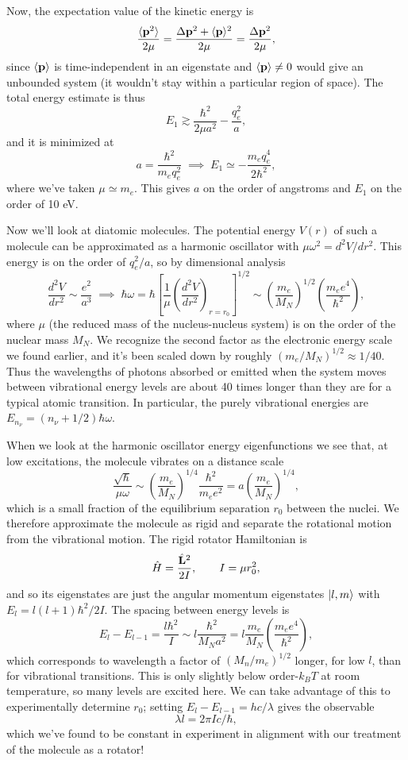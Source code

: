 \documentclass[../p116main.tex]{subfiles}
\begin{document}
Now, the expectation value of the kinetic energy is
\[ \frac{\langle \mathbf{p}^2 \rangle}{2\mu} = \frac{\Delta \mathbf{p}^2 + \langle \mathbf{p} \rangle^2}{2\mu} = \frac{\Delta \mathbf{p}^2}{2\mu}, \]
since $\langle \mathbf{p} \rangle$ is time-independent in an eigenstate and $\langle \mathbf{p} \rangle \neq 0$ would give an unbounded system (it wouldn't stay within a particular region of space).
The total energy estimate is thus
\[ E_1 \gtrsim \frac{\hbar^2}{2\mu a^2} - \frac{q_e^2}{a}, \]
and it is minimized at
\[ a = \frac{\hbar^2}{m_e q_e^2} \;\implies\; E_1 \simeq -\frac{m_e q_e^{4}}{2\hbar^2}, \]
where we've taken $\mu \simeq m_e$.
This gives $a$ on the order of angstroms and $E_1$ on the order of 10 eV.

Now we'll look at diatomic molecules.
The potential energy $V(r)$ of such a molecule can be approximated as a harmonic oscillator with $\mu \omega^2 = d^2 V / dr^2$.
This energy is on the order of $q_e^2 / a$, so by dimensional analysis
\[ \frac{d^2 V}{dr^2} \sim \frac{e^2}{a^3} \;\implies\; \hbar \omega = \hbar \left[ \frac{1}{\mu} \left( \frac{d^2 V}{dr^2} \right)_{r = r_0} \right]^{1 / 2} \sim \left( \frac{m_e}{M_N} \right)^{1 / 2} \left( \frac{m_e e^{4}}{\hbar^2} \right), \]
where $\mu$ (the reduced mass of the nucleus-nucleus system) is on the order of the nuclear mass $M_N$.
We recognize the second factor as the electronic energy scale we found earlier, and it's been scaled down by roughly $(m_e / M_N)^{1 / 2} \approx 1 / 40$.
Thus the wavelengths of photons absorbed or emitted when the system moves between vibrational energy levels are about 40 times longer than they are for a typical atomic transition.
In particular, the purely vibrational energies are $E_{n_\nu} = (n_\nu + 1 / 2) \hbar \omega$.

When we look at the harmonic oscillator energy eigenfunctions we see that, at low excitations, the molecule vibrates on a distance scale
\[ \frac{\sqrt{\hbar}}{\mu \omega} \sim \left( \frac{m_e}{M_N} \right)^{1 / 4} \frac{\hbar^2}{m_e e^2} = a \left( \frac{m_e}{M_N} \right)^{1 / 4}, \]
which is a small fraction of the equilibrium separation $r_0$ between the nuclei.
We therefore approximate the molecule as rigid and separate the rotational motion from the vibrational motion.
The rigid rotator Hamiltonian is    \vspace{-4pt}
\[ \hat H = \frac{\hat{\mathbf{L}}^2}{2I}, \qquad I = \mu r_0^2, \]
and so its eigenstates are just the angular momentum eigenstates $\left| l,m \right>$ with $E_l = l(l+1)\hbar^2 / 2I$.
The spacing between energy levels is
\[ E_l - E_{l-1} = \frac{l\hbar^2}{I} \sim l \frac{\hbar^2}{M_N a^2} = l \frac{m_e}{M_N} \left( \frac{m_e e^{4}}{\hbar^2} \right), \]
which corresponds to wavelength a factor of $(M_n / m_e)^{1 / 2}$ longer, for low $l$, than for vibrational transitions.
This is only slightly below order-$k_B T$ at room temperature, so many levels are excited here.
We can take advantage of this to experimentally determine $r_0$; setting $E_l - E_{l-1} = hc / \lambda$ gives the observable
\[ \lambda l = 2\pi I c / \hbar, \]
which we've found to be constant in experiment in alignment with our treatment of the molecule as a rotator!
\end{document}

